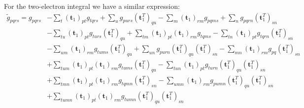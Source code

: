 For the two-electron integral we have a similar expression:
\begin{equation}
  \begin{split}
    {\tilde g}_{pqrs}=g_{pqrs}&-\sum_t(\mathbf{t}_1)_{pt}g_{tqrs}+\sum_ug_{purs}(\mathbf{t}_1^T)_{qu}-\sum_m(\mathbf{t}_1)_{rm}g_{pqms}+\sum_ng_{pqrn}(\mathbf{t}_1^T)_{sn}\\
    &-\sum_{tu}(\mathbf{t}_1)_{pt}g_{turs}(\mathbf{t}_1^T)_{qu}+\sum_{tm}(\mathbf{t}_1)_{pt}(\mathbf{t}_1)_{rm}g_{tqms}-\sum_{tn}(\mathbf{t}_1)_{pt}g_{tqrn}(\mathbf{t}_1^T)_{sn}\\
    &-\sum_{um}(\mathbf{t}_1)_{rm}g_{tums}(\mathbf{t}_1^T)_{qu}+\sum_{un}g_{purn}(\mathbf{t}_1^T)_{qu}(\mathbf{t}_1^T)_{sn}-\sum_{mn}(\mathbf{t}_1)_{rm}g_{pq}(\mathbf{t}_1^T)_{sn}\\
    &+\sum_{tum}(\mathbf{t}_1)_{pt}(\mathbf{t}_1)_{rm}g_{tums}(\mathbf{t}_1^T)_{qu}-\sum_{tun}(\mathbf{t}_1)_{pt}g_{turn}(\mathbf{t}_1^T)_{qu}(\mathbf{t}_1^T)_{sn}\\
    &+\sum_{tmn}(\mathbf{t}_1)_{pt}(\mathbf{t}_1)_{rm}g_{tqmn}(\mathbf{t}_1^T)_{sn}-\sum_{umn}(\mathbf{t}_1)_{rm}g_{pumn}(\mathbf{t}_1^T)_{qu}(\mathbf{t}_1^T)_{sn}\\
    &+\sum_{tumn}(\mathbf{t}_1)_{pt}(\mathbf{t}_1)_{rm}g_{tumn}(\mathbf{t}_1^T)_{qu}(\mathbf{t}_1^T)_{sn}
  \end{split}
\end{equation}

